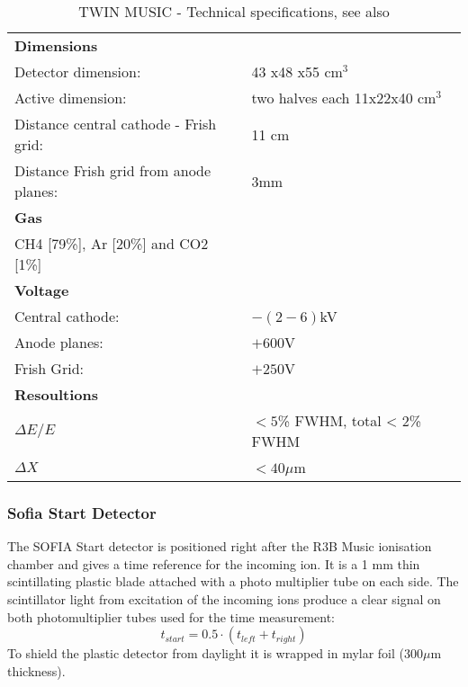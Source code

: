 \newline
\begin{table}[h!]
    \centering
    \begin{tabular}{ll}
        \hline
        \textbf{Dimensions} & \\ 
	Detector dimension: & 43 x48 x55 cm$^3$ \\ 
	Active dimension: & two halves each  11x22x40 cm$^3$\\
	Distance central cathode - Frish grid: & 11 cm\\
	Distance Frish grid from anode planes: & 3mm\\ %
	\textbf{Gas} &\\
	CH4 [79\%], Ar [20\%] and CO2 [1\%] \\
	\textbf{Voltage} & \\
	Central cathode: &  $-(2-6)$kV \\
	Anode planes: & $+600$V \\
	Frish Grid: & $+250$V\\
	\textbf{Resoultions} & \\
	$\Delta E / E$ & $< 5$\% FWHM, total < 2\% FWHM \\
	$\Delta X$ & $< 40 \mu$m\\
	\hline
    \end{tabular}
    \caption{TWIN MUSIC - Technical specifications, see also \cite{martin2021fission}}
	\label{table:twin_tecs}
\end{table}
\newline
    

\subsubsection{Sofia Start Detector}
The SOFIA Start detector is positioned right after the R3B Music ionisation chamber and gives a time reference for the incoming ion. It is a 1 mm thin scintillating plastic blade attached with a photo multiplier tube on each side. The scintillator light from excitation of the incoming ions produce a clear signal on both photomultiplier tubes used for the time measurement: \[t_{start} = 0.5 \cdot (t_{left}+t_{right}) \]\newline
To shield the plastic detector from daylight it is wrapped in mylar foil (300$\mu$m thickness).
